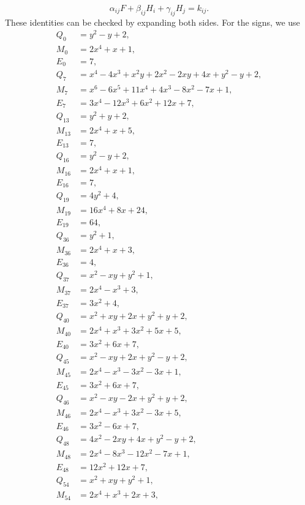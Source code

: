 \documentclass[11pt]{article}
\begin{document}
\begin{equation}\label{eq:sep}
\alpha_{ij}F+\beta_{ij}H_i+\gamma_{ij}H_j=k_{ij}.
\end{equation}
These identities can be checked by expanding both sides.
For the signs, we use
\begin{align*}
Q_{0}&=y^{2}-y+2,\\
M_{0}&=2x^{4}+x+1,\\
E_{0}&=7,\\
Q_{7}&=x^{4}-4x^{3}+x^{2}y+2x^{2}-2xy+4x+y^{2}-y+2,\\
M_{7}&=x^{6}-6x^{5}+11x^{4}+4x^{3}-8x^{2}-7x+1,\\
E_{7}&=3x^{4}-12x^{3}+6x^{2}+12x+7,\\
Q_{13}&=y^{2}+y+2,\\
M_{13}&=2x^{4}+x+5,\\
E_{13}&=7,\\
Q_{16}&=y^{2}-y+2,\\
M_{16}&=2x^{4}+x+1,\\
E_{16}&=7,\\
Q_{19}&=4y^{2}+4,\\
M_{19}&=16x^{4}+8x+24,\\
E_{19}&=64,\\
Q_{36}&=y^{2}+1,\\
M_{36}&=2x^{4}+x+3,\\
E_{36}&=4,\\
Q_{37}&=x^{2}-xy+y^{2}+1,\\
M_{37}&=2x^{4}-x^{3}+3,\\
E_{37}&=3x^{2}+4,\\
Q_{40}&=x^{2}+xy+2x+y^{2}+y+2,\\
M_{40}&=2x^{4}+x^{3}+3x^{2}+5x+5,\\
E_{40}&=3x^{2}+6x+7,\\
Q_{45}&=x^{2}-xy+2x+y^{2}-y+2,\\
M_{45}&=2x^{4}-x^{3}-3x^{2}-3x+1,\\
E_{45}&=3x^{2}+6x+7,\\
Q_{46}&=x^{2}-xy-2x+y^{2}+y+2,\\
M_{46}&=2x^{4}-x^{3}+3x^{2}-3x+5,\\
E_{46}&=3x^{2}-6x+7,\\
Q_{48}&=4x^{2}-2xy+4x+y^{2}-y+2,\\
M_{48}&=2x^{4}-8x^{3}-12x^{2}-7x+1,\\
E_{48}&=12x^{2}+12x+7,\\
Q_{54}&=x^{2}+xy+y^{2}+1,\\
M_{54}&=2x^{4}+x^{3}+2x+3,\\

\end{align*}
\end{document}
